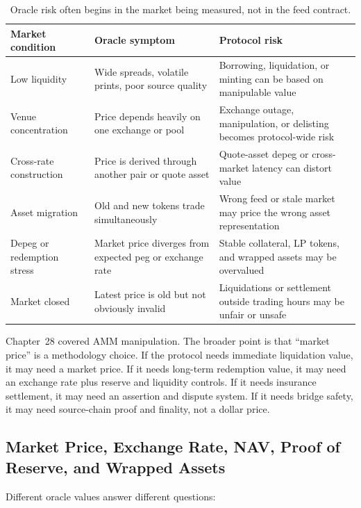 \begin{table}[htbp]
\centering
\small
\renewcommand{\arraystretch}{1.16}
\begin{tabularx}{\textwidth}{@{}>{\RaggedRight\arraybackslash}p{}>{\RaggedRight\arraybackslash}p{}X@{}}
\toprule
Market condition & Oracle symptom & Protocol risk \\
\midrule
Low liquidity & Wide spreads, volatile prints, poor source quality & Borrowing, liquidation, or minting can be based on manipulable value \\
Venue concentration & Price depends heavily on one exchange or pool & Exchange outage, manipulation, or delisting becomes protocol-wide risk \\
Cross-rate construction & Price is derived through another pair or quote asset & Quote-asset depeg or cross-market latency can distort value \\
Asset migration & Old and new tokens trade simultaneously & Wrong feed or stale market may price the wrong asset representation \\
Depeg or redemption stress & Market price diverges from expected peg or exchange rate & Stable collateral, LP tokens, and wrapped assets may be overvalued \\
Market closed & Latest price is old but not obviously invalid & Liquidations or settlement outside trading hours may be unfair or unsafe \\
\bottomrule
\end{tabularx}
\caption{Oracle risk often begins in the market being measured, not in the feed contract.}
\end{table}

Chapter~28 covered AMM manipulation. The broader point is that ``market price'' is a methodology choice. If the protocol needs immediate liquidation value, it may need a market price. If it needs long-term redemption value, it may need an exchange rate plus reserve and liquidity controls. If it needs insurance settlement, it may need an assertion and dispute system. If it needs bridge safety, it may need source-chain proof and finality, not a dollar price.

\subsection{Market Price, Exchange Rate, NAV, Proof of Reserve, and Wrapped Assets}

Different oracle values answer different questions:

